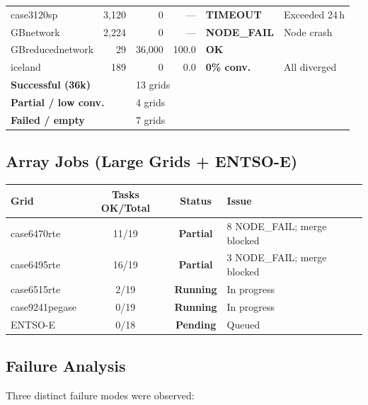 \documentclass{article}
\newcommand{\statusok}[1]{\textcolor{good}{\textbf{#1}}}
\newcommand{\statuswarn}[1]{\textcolor{warn}{\textbf{#1}}}
\newcommand{\statusbad}[1]{\textcolor{bad}{\textbf{#1}}}
\newcommand{\statusrun}[1]{\textcolor{running}{\textbf{#1}}}
\begin{document}
\begin{longtable}{l r r r l l}
case3120sp    & 3{,}120  & 0   & ---   & \statusbad{TIMEOUT} & Exceeded 24\,h \\
GBnetwork     & 2{,}224  & 0   & ---   & \statusbad{NODE\_FAIL} & Node crash \\
GBreducednetwork & 29 & 36{,}000 & 100.0 & \statusok{OK} & \\
iceland       & 189  & 0        & 0.0   & \statusbad{0\% conv.} & All diverged \\
\midrule
\multicolumn{2}{l}{\textbf{Successful (36k)}} & \multicolumn{4}{l}{13 grids} \\
\multicolumn{2}{l}{\textbf{Partial / low conv.}} & \multicolumn{4}{l}{4 grids} \\
\multicolumn{2}{l}{\textbf{Failed / empty}} & \multicolumn{4}{l}{7 grids} \\
\bottomrule
\end{longtable}


\subsection{Array Jobs (Large Grids + ENTSO-E)}

\begin{tabular}{l c c l}
\toprule
\textbf{Grid} & \textbf{Tasks OK/Total} & \textbf{Status} & \textbf{Issue} \\
\midrule
case6470rte   & 11/19 & \statuswarn{Partial} & 8 NODE\_FAIL; merge blocked \\
case6495rte   & 16/19 & \statuswarn{Partial} & 3 NODE\_FAIL; merge blocked \\
case6515rte   & 2/19  & \statusrun{Running}  & In progress \\
case9241pegase & 0/19 & \statusrun{Running}  & In progress \\
ENTSO-E       & 0/18  & \statusrun{Pending}  & Queued \\
\bottomrule
\end{tabular}


\subsection{Failure Analysis}

Three distinct failure modes were observed:
\end{document}
